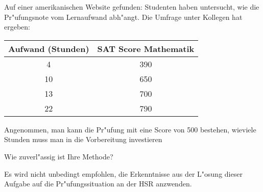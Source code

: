 Auf einer amerikanischen Website gefunden: Studenten haben untersucht,
wie die Pr"ufungsnote vom Lernaufwand abh"angt.
Die Umfrage unter Kollegen hat ergeben:
\begin{center}
\begin{tabular}{c|c}
Aufwand (Stunden)&SAT Score Mathematik\\
\hline
4&390\\
10&650\\
13&700\\
22&790
\end{tabular}
\end{center}
\begin{teilaufgaben}
\item
Angenommen, man kann die Pr"ufung mit eine Score von 500 bestehen, 
wieviele Stunden muss man in die Vorbereitung investieren
\item
Wie zuverl"assig ist Ihre Methode?
\end{teilaufgaben}

\begin{hinweis}
Es wird nicht unbedingt empfohlen, die Erkenntnisse aus der
L"osung dieser Aufgabe auf die Pr"ufungssituation an der HSR anzwenden.
\end{hinweis}

